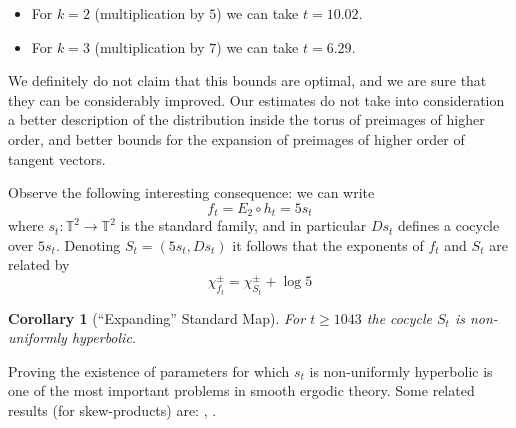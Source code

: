 \documentclass[11pt,letterpaper,reqno]{article}
\newtheorem{corollary}{Corollary}[section]
\newcommand{\Tor}{\mathbb{T}^2}
\begin{document}
\begin{itemize}
	\item For $k=2$ (multiplication by $5$) we can take $t=10.02$.
    \item For $k=3$ (multiplication by $7$) we can take $t=6.29$.
\end{itemize}

We definitely do not claim that this bounds are optimal, and we are sure that they can be considerably improved. Our estimates do not take into consideration a better description of the distribution inside the torus of preimages of higher order, and better bounds for the expansion of preimages of higher order of tangent vectors.




\smallskip 
   

Observe the following interesting consequence: we can write
\[
	f_t=E_2\circ h_t= 5s_t
\]
where $s_t:\Tor\to\Tor$ is the standard family, and in particular $Ds_t$ defines a cocycle over $5s_t$. Denoting $S_t=(5s_t,Ds_t)$ it follows that the exponents of $f_t$ and $S_t$ are related by
\[
	\chi_{f_t}^{\pm}=\chi^{\pm}_{S_t}+\log 5
\] 

\begin{corollary}[``Expanding'' Standard Map]
For $t\geq 1043$ the cocycle $S_t$ is non-uniformly hyperbolic.
\end{corollary}

Proving the existence of parameters for which $s_t$ is non-uniformly hyperbolic is one of the most important problems in smooth ergodic theory. Some related results (for skew-products) are: \cite{NUHD}, \cite{LyaRandom}.
\end{document}
